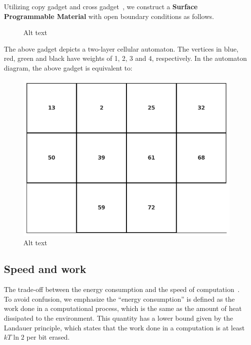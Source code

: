 \documentclass[twocolumn,superscriptaddress,english,showpacs,longbibliography]{revtex4-2}
\begin{document}
Utilizing copy gadget and cross gadget~\cite{Nguyen2023}, we construct a \textbf{Surface Programmable Material} with open boundary conditions as follows.

\begin{figure}
\centering

\caption{Alt text}
\end{figure}

The above gadget depicts a two-layer cellular automaton. The vertices in
blue, red, green and black have weights of 1, 2, 3 and 4, respectively.
In the automaton diagram, the above gadget is equivalent to:

\begin{figure}
\centering
\includegraphics[width=\columnwidth]{../notes/images/rule110_2-2_automaton.png}
\caption{Alt text}
\end{figure}

\subsection{Speed and work}\label{speed-and-work}

The trade-off between the energy consumption and the speed of
computation~\cite{Feynman2018}. To avoid confusion, we emphasize the
``energy consumption'' is defined as the work done in a computational
process, which is the same as the amount of heat dissipated to the
environment. This quantity has a lower bound given by the Landauer
principle, which states that the work done in a computation is at least
$kT\ln 2$ per bit erased\cite{Reeb2014}.
\end{document}
